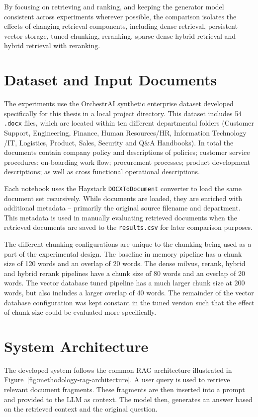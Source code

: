 By focusing on retrieving and ranking, and keeping the generator model consistent across experiments wherever possible, the comparison isolates the effects of changing retrieval components, including dense retrieval, persistent vector storage, tuned chunking, reranking, sparse-dense hybrid retrieval and hybrid retrieval with reranking.

\section{Dataset and Input Documents}
The experiments use the OrchestrAI synthetic enterprise dataset developed specifically for this thesis in a local project directory. This dataset includes 54 \texttt{.docx} files, which are located within ten different departmental folders (Customer Support, Engineering, Finance, Human Resources/HR, Information Technology /IT, Logistics, Product, Sales, Security and Q\&A Handbooks). In total the documents contain company policy and descriptions of policies; customer service procedures; on-boarding work flow; procurement processes; product development descriptions; as well as cross functional operational descriptions.

Each notebook uses the Haystack \texttt{DOCXTo\allowbreak Document} converter to load the same document set recursively. While documents are loaded, they are enriched with additional metadata – primarily the original source filename and department. This metadata is used in manually evaluating retrieved documents when the retrieved documents are saved to the \texttt{results.csv} for later comparison purposes. 

The different chunking configurations are unique to the chunking being used as a part of the experimental design. The baseline in memory pipeline has a chunk size of 120 words and an overlap of 20 words. The dense milvus, rerank, hybrid and hybrid rerank pipelines have a chunk size of 80 words and an overlap of 20 words. The vector database tuned pipeline has a much larger chunk size at 200 words, but also includes a larger overlap of 40 words. The remainder of the vector database configuration was kept constant in the tuned version such that the effect of chunk size could be evaluated more specifically.

\section{System Architecture}

The developed system follows the common \ac{RAG} architecture illustrated in Figure~\ref{fig:methodology-rag-architecture}. A user query is used to retrieve relevant document fragments. These fragments are then inserted into a prompt and provided to the \ac{LLM} as context. The model then, generates an answer based on the retrieved context and the original question.

